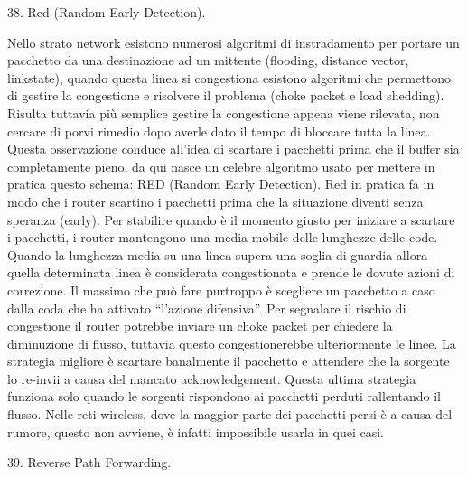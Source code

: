 38.	Red (Random Early Detection).

Nello strato network esistono numerosi algoritmi di instradamento per portare un pacchetto da una destinazione ad un mittente (flooding, distance vector, linkstate), quando questa linea si congestiona esistono algoritmi che permettono di gestire la congestione e risolvere il problema (choke packet e load shedding). Risulta tuttavia più semplice gestire la congestione appena viene rilevata, non cercare di porvi rimedio dopo averle dato il tempo di bloccare tutta la linea.
Questa osservazione conduce all’idea di scartare i pacchetti prima che il buffer sia completamente pieno, da qui nasce un celebre algoritmo usato per mettere in pratica questo schema: RED (Random Early Detection).
Red in pratica fa in modo che i router scartino i pacchetti prima che la situazione diventi senza speranza (early). Per stabilire quando è il momento giusto per iniziare a scartare i pacchetti, i router mantengono una media mobile delle lunghezze delle code. Quando la lunghezza media su una linea supera una soglia di guardia allora quella determinata linea è considerata congestionata e prende le dovute azioni di correzione. Il massimo che può fare purtroppo è scegliere un pacchetto a caso dalla coda che ha attivato “l’azione difensiva”. Per segnalare il rischio di congestione il router potrebbe inviare un choke packet per chiedere la diminuzione di flusso, tuttavia questo congestionerebbe ulteriormente le linee. La strategia migliore è scartare banalmente il pacchetto e attendere che la sorgente lo re-invii a causa del mancato acknowledgement. Questa ultima strategia funziona solo quando le sorgenti rispondono ai pacchetti perduti rallentando il flusso. Nelle reti wireless, dove la maggior parte dei pacchetti persi è a causa del rumore, questo non avviene, è infatti impossibile usarla in quei casi.

39.	Reverse Path Forwarding.

